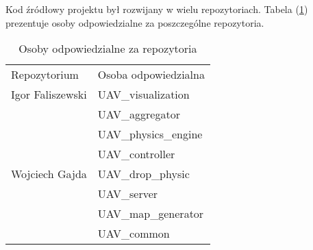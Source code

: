 \newpage
Kod źródłowy projektu był rozwijany w wielu repozytoriach.
Tabela (\ref{rep_rep}) prezentuje osoby odpowiedzialne za poszczególne repozytoria.

\renewcommand{\arraystretch}{1.1}
\begin{table}[!h]
	\centering
	\begin{tabular}{|m{}|m{}|} 
		\hline
		\rowcolor{Gray}
		Repozytorium &  Osoba odpowiedzialna \\
		\multirow{1}{12em}{Igor Faliszewski} 
		& UAV\_visualization \\
		\hline
		\multirow{7}{12em}{{Wojciech Gajda}} 
		& UAV\_aggregator \\
		& UAV\_physics\_engine\\
		& UAV\_controller \\
		& UAV\_drop\_physic \\
		& UAV\_server \\
		& UAV\_map\_generator \\
		& UAV\_common \\
		\hline
	\end{tabular}
	\caption{Osoby odpowiedzialne za repozytoria}
	\label{rep_rep}
\end{table}